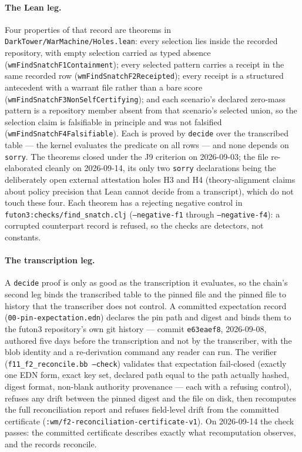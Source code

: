 \paragraph{The Lean leg.}  Four properties of that record are theorems in
\texttt{DarkTower/WarMachine/Holes.lean}: every selection lies inside the
recorded repository, with empty selection carried as typed absence
(\texttt{wmFindSnatchF1Containment}); every selected pattern carries a
receipt in the same recorded row (\texttt{wmFindSnatchF2Receipted});
every receipt is a structured antecedent with a warrant file rather than
a bare score (\texttt{wmFindSnatchF3NonSelfCertifying}); and each
scenario's declared zero-mass pattern is a repository member absent from
that scenario's selected union, so the selection claim is falsifiable in
principle and was not falsified (\texttt{wmFindSnatchF4Falsifiable}).
Each is proved by \texttt{decide} over the transcribed table --- the
kernel evaluates the predicate on all rows --- and none depends on
\texttt{sorry}.  The theorems closed under the J9 criterion on
2026-09-03; the file re-elaborated cleanly on 2026-09-14, its only two
\texttt{sorry} declarations being the deliberately open external
attestation holes H3 and H4 (theory-alignment claims about policy
precision that Lean cannot decide from a transcript), which do not touch
these four.  Each theorem has a rejecting negative control in
\texttt{futon3:checks/find\_snatch.clj} (\texttt{--negative-f1} through
\texttt{--negative-f4}): a corrupted counterpart record is refused, so
the checks are detectors, not constants.

\paragraph{The transcription leg.}  A \texttt{decide} proof is only as
good as the transcription it evaluates, so the chain's second leg binds
the transcribed table to the pinned file and the pinned file to history
that the transcriber does not control.  A committed expectation record
(\texttt{00-pin-expectation.edn}) declares the pin path and digest and
binds them to the futon3 repository's own git history --- commit
\texttt{e63eaef8}, 2026-09-08, authored five days before the
transcription and not by the transcriber, with the blob identity and a
re-derivation command any reader can run.  The verifier
(\texttt{f11\_f2\_reconcile.bb --check}) validates that expectation
fail-closed (exactly one EDN form, exact key set, declared path equal to
the path actually hashed, digest format, non-blank authority provenance
--- each with a refusing control), refuses any drift between the pinned
digest and the file on disk, then recomputes the full reconciliation
report and refuses field-level drift from the committed certificate
(\texttt{:wm/f2-reconciliation-certificate-v1}).  On 2026-09-14 the check
passes: the committed certificate describes exactly what recomputation
observes, and the records reconcile.

